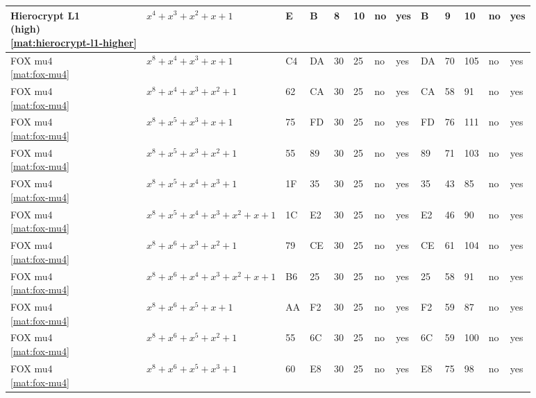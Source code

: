 \begin{tiny}
\begin{longtable}{|l|l|l|l|l|l|l|l|l|l|l|l|l|}
\shortstack{Hierocrypt L1 \\ (high) \\ \eqref{mat:hierocrypt-l1-higher}} & $x^4 + x^3 + x^2 + x + 1$ & E & B & 8 & 10 & no & yes & B & 9 & 10 & no & yes \\ \hline
\shortstack{FOX mu4 \\ \eqref{mat:fox-mu4}} & $x^8 + x^4 + x^3 + x + 1$ & C4 & DA & 30 & 25 & no & yes & DA & 70 & 105 & no & yes \\ \hline
\shortstack{FOX mu4 \\ \eqref{mat:fox-mu4}} & $x^8 + x^4 + x^3 + x^2 + 1$ & 62 & CA & 30 & 25 & no & yes & CA & 58 & 91 & no & yes \\ \hline
\shortstack{FOX mu4 \\ \eqref{mat:fox-mu4}} & $x^8 + x^5 + x^3 + x + 1$ & 75 & FD & 30 & 25 & no & yes & FD & 76 & 111 & no & yes \\ \hline
\shortstack{FOX mu4 \\ \eqref{mat:fox-mu4}} & $x^8 + x^5 + x^3 + x^2 + 1$ & 55 & 89 & 30 & 25 & no & yes & 89 & 71 & 103 & no & yes \\ \hline
\shortstack{FOX mu4 \\ \eqref{mat:fox-mu4}} & $x^8 + x^5 + x^4 + x^3 + 1$ & 1F & 35 & 30 & 25 & no & yes & 35 & 43 & 85 & no & yes \\ \hline
\shortstack{FOX mu4 \\ \eqref{mat:fox-mu4}} & $x^8 + x^5 + x^4 + x^3 + x^2 + x + 1$ & 1C & E2 & 30 & 25 & no & yes & E2 & 46 & 90 & no & yes \\ \hline
\shortstack{FOX mu4 \\ \eqref{mat:fox-mu4}} & $x^8 + x^6 + x^3 + x^2 + 1$ & 79 & CE & 30 & 25 & no & yes & CE & 61 & 104 & no & yes \\ \hline
\shortstack{FOX mu4 \\ \eqref{mat:fox-mu4}} & $x^8 + x^6 + x^4 + x^3 + x^2 + x + 1$ & B6 & 25 & 30 & 25 & no & yes & 25 & 58 & 91 & no & yes \\ \hline
\shortstack{FOX mu4 \\ \eqref{mat:fox-mu4}} & $x^8 + x^6 + x^5 + x + 1$ & AA & F2 & 30 & 25 & no & yes & F2 & 59 & 87 & no & yes \\ \hline
\shortstack{FOX mu4 \\ \eqref{mat:fox-mu4}} & $x^8 + x^6 + x^5 + x^2 + 1$ & 55 & 6C & 30 & 25 & no & yes & 6C & 59 & 100 & no & yes \\ \hline
\shortstack{FOX mu4 \\ \eqref{mat:fox-mu4}} & $x^8 + x^6 + x^5 + x^3 + 1$ & 60 & E8 & 30 & 25 & no & yes & E8 & 75 & 98 & no & yes \\ \hline

\end{longtable}
\end{tiny}
